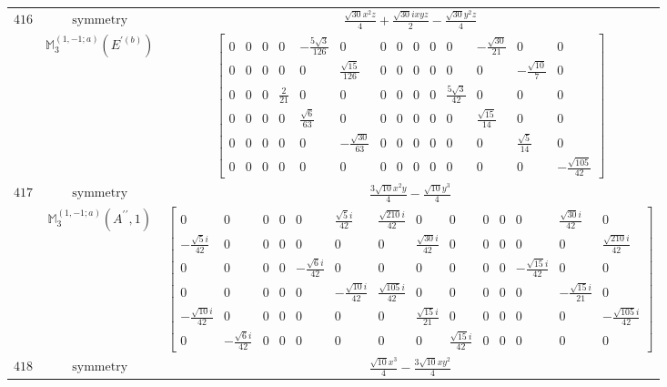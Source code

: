 \documentclass[fleqn,8pt,landscape]{jsarticle}
\begin{document}
\begin{longtable}{ccc}
$ 416 $ & $ \text{symmetry} $ & $ \frac{\sqrt{30} x^{2} z}{4} + \frac{\sqrt{30} i x y z}{2} - \frac{\sqrt{30} y^{2} z}{4} $ \\
$  $ & $ \mathbb{M}_{3}^{(1,-1;a)}(E^{\prime(b)}) $ & $ \begin{bmatrix} 0 & 0 & 0 & 0 & - \frac{5 \sqrt{3}}{126} & 0 & 0 & 0 & 0 & 0 & 0 & - \frac{\sqrt{30}}{21} & 0 & 0 \\ 0 & 0 & 0 & 0 & 0 & \frac{\sqrt{15}}{126} & 0 & 0 & 0 & 0 & 0 & 0 & - \frac{\sqrt{10}}{7} & 0 \\ 0 & 0 & 0 & \frac{2}{21} & 0 & 0 & 0 & 0 & 0 & 0 & \frac{5 \sqrt{3}}{42} & 0 & 0 & 0 \\ 0 & 0 & 0 & 0 & \frac{\sqrt{6}}{63} & 0 & 0 & 0 & 0 & 0 & 0 & \frac{\sqrt{15}}{14} & 0 & 0 \\ 0 & 0 & 0 & 0 & 0 & - \frac{\sqrt{30}}{63} & 0 & 0 & 0 & 0 & 0 & 0 & \frac{\sqrt{5}}{14} & 0 \\ 0 & 0 & 0 & 0 & 0 & 0 & 0 & 0 & 0 & 0 & 0 & 0 & 0 & - \frac{\sqrt{105}}{42} \end{bmatrix} $ \\ \hline
$ 417 $ & $ \text{symmetry} $ & $ \frac{3 \sqrt{10} x^{2} y}{4} - \frac{\sqrt{10} y^{3}}{4} $ \\
$  $ & $ \mathbb{M}_{3}^{(1,-1;a)}(A^{\prime\prime},1) $ & $ \begin{bmatrix} 0 & 0 & 0 & 0 & 0 & \frac{\sqrt{5} i}{42} & \frac{\sqrt{210} i}{42} & 0 & 0 & 0 & 0 & 0 & \frac{\sqrt{30} i}{42} & 0 \\ - \frac{\sqrt{5} i}{42} & 0 & 0 & 0 & 0 & 0 & 0 & \frac{\sqrt{30} i}{42} & 0 & 0 & 0 & 0 & 0 & \frac{\sqrt{210} i}{42} \\ 0 & 0 & 0 & 0 & - \frac{\sqrt{6} i}{42} & 0 & 0 & 0 & 0 & 0 & 0 & - \frac{\sqrt{15} i}{42} & 0 & 0 \\ 0 & 0 & 0 & 0 & 0 & - \frac{\sqrt{10} i}{42} & \frac{\sqrt{105} i}{42} & 0 & 0 & 0 & 0 & 0 & - \frac{\sqrt{15} i}{21} & 0 \\ - \frac{\sqrt{10} i}{42} & 0 & 0 & 0 & 0 & 0 & 0 & \frac{\sqrt{15} i}{21} & 0 & 0 & 0 & 0 & 0 & - \frac{\sqrt{105} i}{42} \\ 0 & - \frac{\sqrt{6} i}{42} & 0 & 0 & 0 & 0 & 0 & 0 & \frac{\sqrt{15} i}{42} & 0 & 0 & 0 & 0 & 0 \end{bmatrix} $ \\ \hline
$ 418 $ & $ \text{symmetry} $ & $ \frac{\sqrt{10} x^{3}}{4} - \frac{3 \sqrt{10} x y^{2}}{4} $ \\

\end{longtable}
\end{document}
